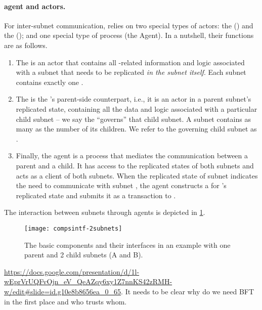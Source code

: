 \paragraph{\ipc agent and actors.}
For inter-subnet communication, \ipc relies on two special types of actors: the \gwFull (\gw) and the \saFull (\sa); and one special type of process (the \ipc Agent).
In a nutshell, their functions are as follows.
\begin{enumerate}
    \item The \gw is an actor that contains all \ipc-related information and logic associated with a subnet that needs to be replicated \emph{in the subnet itself}.
    Each subnet contains exactly one \gw.

    \item The \sa is the \gw's parent-side counterpart, i.e., it is an actor in a parent subnet's replicated state,
    containing all the data and logic associated with a particular child subnet -- we say the \sa ``governs'' that child subnet.
    A subnet contains as many \saFulls as the number of its children.
    We refer to the \sa governing child subnet  as .
    

    \item Finally, the \ipc agent is a process that mediates the communication between a parent and a child.
    It has access to the replicated states of both subnets and acts as a client of both subnets.
    When the replicated state of subnet  indicates the need to communicate with subnet ,
    the \ipc agent constructs a \pof for 's replicated state and submits it as a transaction to .
\end{enumerate}
The interaction between subnets through \ipc agents is depicted in \cref{fig:interfaces}.

\begin{figure}[ht]
     \centering
     \texttt{[image: compsintf-2subnets]}
     \caption{The basic \ipc components and their interfaces in an example with one parent and 2 child subnets (A and B). }
     \label{fig:interfaces}
 \end{figure}


 \url{https://docs.google.com/presentation/d/1l-wEprVrUQFvOjn_eV_QeAZqy6xy1Z7nnKS42zRMH-w/edit#slide=id.g10e8b8656ea_0_65}. It needs to be clear why do we need BFT in the first place and who trusts whom.
